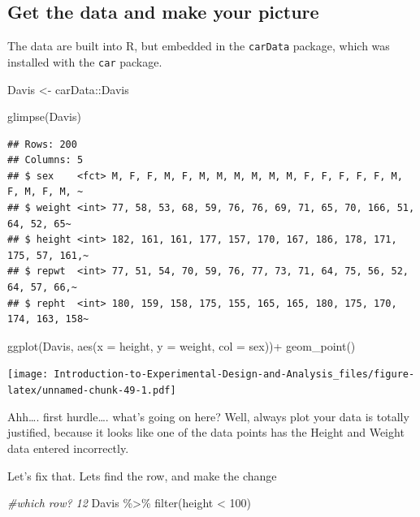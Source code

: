 \documentclass[
]{book}
\newenvironment{Shaded}{\begin{snugshade}}{\end{snugshade}}
\newcommand{\AttributeTok}[1]{\textcolor[rgb]{0.77,0.63,0.00}{#1}}
\newcommand{\CommentTok}[1]{\textcolor[rgb]{0.56,0.35,0.01}{\textit{#1}}}
\newcommand{\DecValTok}[1]{\textcolor[rgb]{0.00,0.00,0.81}{#1}}
\newcommand{\FunctionTok}[1]{\textcolor[rgb]{0.00,0.00,0.00}{#1}}
\newcommand{\NormalTok}[1]{#1}
\newcommand{\OtherTok}[1]{\textcolor[rgb]{0.56,0.35,0.01}{#1}}
\newcommand{\SpecialCharTok}[1]{\textcolor[rgb]{0.00,0.00,0.00}{#1}}
\begin{document}
\hypertarget{get-the-data-and-make-your-picture}{%
\subsection{Get the data and make your picture}\label{get-the-data-and-make-your-picture}}

The data are built into R, but embedded in the \texttt{carData} package, which was installed with the \texttt{car} package.

\begin{Shaded}
\begin{Highlighting}[]
\NormalTok{Davis }\OtherTok{\textless{}{-}}\NormalTok{ carData}\SpecialCharTok{::}\NormalTok{Davis}

\FunctionTok{glimpse}\NormalTok{(Davis)}
\end{Highlighting}
\end{Shaded}

\begin{verbatim}
## Rows: 200
## Columns: 5
## $ sex    <fct> M, F, F, M, F, M, M, M, M, M, M, F, F, F, F, F, M, F, M, F, M, ~
## $ weight <int> 77, 58, 53, 68, 59, 76, 76, 69, 71, 65, 70, 166, 51, 64, 52, 65~
## $ height <int> 182, 161, 161, 177, 157, 170, 167, 186, 178, 171, 175, 57, 161,~
## $ repwt  <int> 77, 51, 54, 70, 59, 76, 77, 73, 71, 64, 75, 56, 52, 64, 57, 66,~
## $ repht  <int> 180, 159, 158, 175, 155, 165, 165, 180, 175, 170, 174, 163, 158~
\end{verbatim}

\begin{Shaded}
\begin{Highlighting}[]
\FunctionTok{ggplot}\NormalTok{(Davis, }\FunctionTok{aes}\NormalTok{(}\AttributeTok{x =}\NormalTok{ height, }\AttributeTok{y =}\NormalTok{ weight, }\AttributeTok{col =}\NormalTok{ sex))}\SpecialCharTok{+}
  \FunctionTok{geom\_point}\NormalTok{()}
\end{Highlighting}
\end{Shaded}

\texttt{[image: Introduction-to-Experimental-Design-and-Analysis\_files/figure-latex/unnamed-chunk-49-1.pdf]}

Ahh\ldots. first hurdle\ldots. what's going on here? Well, always plot your data is totally justified, because it looks like one of the data points has the Height and Weight data entered incorrectly.

Let's fix that. Lets find the row, and make the change

\begin{Shaded}
\begin{Highlighting}[]
\CommentTok{\#which row? 12}
\NormalTok{Davis }\SpecialCharTok{\%\textgreater{}\%} \FunctionTok{filter}\NormalTok{(height }\SpecialCharTok{\textless{}} \DecValTok{100}\NormalTok{)}
\end{Highlighting}
\end{Shaded}
\end{document}
